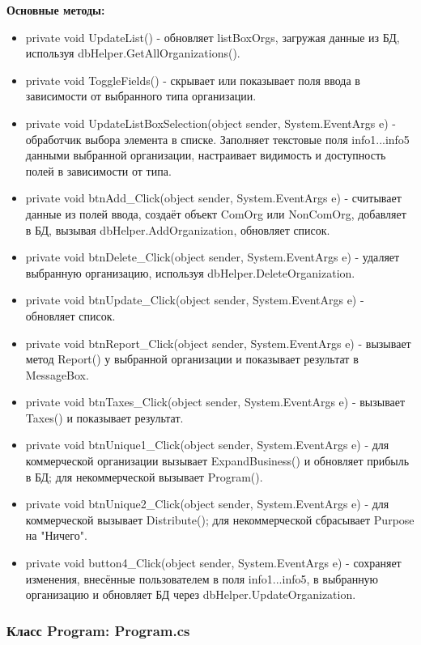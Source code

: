 \documentclass[oneside,a4paper,14pt]{extarticle}
\begin{document}
\textbf{Основные методы:}
\begin{itemize}
    \item private void UpdateList() - обновляет listBoxOrgs, загружая данные из БД, используя dbHelper.GetAllOrganizations().
    \item private void ToggleFields() - скрывает или показывает поля ввода в зависимости от выбранного типа организации.
    \item private void UpdateListBoxSelection(object sender, System.EventArgs e) - обработчик выбора элемента в списке. Заполняет текстовые поля info1...info5 данными выбранной организации, настраивает видимость и доступность полей в зависимости от типа.
    \item private void btnAdd\_Click(object sender, System.EventArgs e) - считывает данные из полей ввода, создаёт объект ComOrg или NonComOrg, добавляет в БД, вызывая dbHelper.AddOrganization, обновляет список.
    \item private void btnDelete\_Click(object sender, System.EventArgs e) - удаляет выбранную организацию, используя dbHelper.DeleteOrganization.
    \item private void btnUpdate\_Click(object sender, System.EventArgs e) - обновляет список.
    \item private void btnReport\_Click(object sender, System.EventArgs e) - вызывает метод Report() у выбранной организации и показывает результат в MessageBox.
    \item private void btnTaxes\_Click(object sender, System.EventArgs e) - вызывает Taxes() и показывает результат.
    \item private void btnUnique1\_Click(object sender, System.EventArgs e) - для коммерческой организации вызывает ExpandBusiness() и обновляет прибыль в БД; для некоммерческой вызывает Program().
    \item private void btnUnique2\_Click(object sender, System.EventArgs e) - для коммерческой вызывает Distribute(); для некоммерческой сбрасывает Purpose на "Ничего".
    \item private void button4\_Click(object sender, System.EventArgs e) - сохраняет изменения, внесённые пользователем в поля info1...info5, в выбранную организацию и обновляет БД через dbHelper.UpdateOrganization.
\end{itemize}

\subsubsection*{Класс Program: Program.cs}
\end{document}
